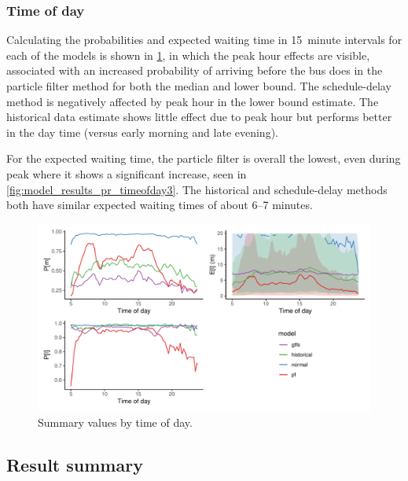 \subsubsection{Time of day}

Calculating the probabilities and expected waiting time in 15~minute intervals for each of the models is shown in \cref{fig:model_results_pr_timeofday}, in which the peak hour effects are visible, associated with an increased probability of arriving before the bus does in the particle filter method for both the median and lower bound. The schedule-delay method is negatively affected by peak hour in the lower bound estimate. The historical data estimate shows little effect due to peak hour but performs better in the day time (versus early morning and late evening).


For the expected waiting time, the particle filter is overall the lowest, even during peak where it shows a significant increase, seen in \cref{fig:model_results_pr_timeofday3}. The historical and schedule-delay methods both have similar expected waiting times of about 6--7 minutes.


\begin{knitrout}\small
{}\color{fgcolor}\begin{figure}
\includegraphics[width=\textwidth]{figure/model_results_pr_timeofday-1} \caption[Summary values by time of day]{Summary values by time of day.}\label{fig:model_results_pr_timeofday}
\end{figure}


\end{knitrout}



\subsection{Result summary}
\label{sec:prediction_model_comp_summary}

